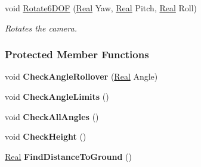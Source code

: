 \begin{DoxyCompactItemize}
void \hyperlink{classphys_1_1CameraController_a23d1b811021fc77135a556de86f4f32a}{Rotate6DOF} (\hyperlink{namespacephys_af7eb897198d265b8e868f45240230d5f}{Real} Yaw, \hyperlink{namespacephys_af7eb897198d265b8e868f45240230d5f}{Real} Pitch, \hyperlink{namespacephys_af7eb897198d265b8e868f45240230d5f}{Real} Roll)
\begin{DoxyCompactList}\small\item\em Rotates the camera. \item\end{DoxyCompactList}\end{DoxyCompactItemize}
\subsubsection*{Protected Member Functions}
\begin{DoxyCompactItemize}
\item 
\hypertarget{classphys_1_1CameraController_a2225da030d5a28930c460d0067103274}{
void {\bfseries CheckAngleRollover} (\hyperlink{namespacephys_af7eb897198d265b8e868f45240230d5f}{Real} Angle)}
\label{classphys_1_1CameraController_a2225da030d5a28930c460d0067103274}

\item 
\hypertarget{classphys_1_1CameraController_a97de22bfe1e8d98ff2fdde03d38332c9}{
void {\bfseries CheckAngleLimits} ()}
\label{classphys_1_1CameraController_a97de22bfe1e8d98ff2fdde03d38332c9}

\item 
\hypertarget{classphys_1_1CameraController_a0a9984ddd68c2a97c52682f90a3008cd}{
void {\bfseries CheckAllAngles} ()}
\label{classphys_1_1CameraController_a0a9984ddd68c2a97c52682f90a3008cd}

\item 
\hypertarget{classphys_1_1CameraController_a1ee87ff32c7fcb04ddb65cb9ac1535da}{
void {\bfseries CheckHeight} ()}
\label{classphys_1_1CameraController_a1ee87ff32c7fcb04ddb65cb9ac1535da}

\item 
\hypertarget{classphys_1_1CameraController_acadfca85be36af4f631b9427cd8e958a}{
\hyperlink{namespacephys_af7eb897198d265b8e868f45240230d5f}{Real} {\bfseries FindDistanceToGround} ()}
\label{classphys_1_1CameraController_acadfca85be36af4f631b9427cd8e958a}

\end{DoxyCompactItemize}

